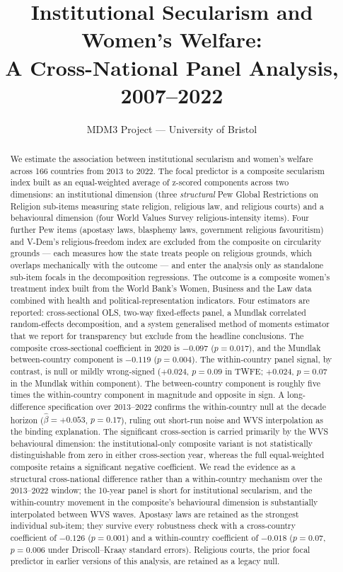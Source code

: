 \documentclass[12pt,a4paper]{article}
\title{Institutional Secularism and Women's Welfare:\\
A Cross-National Panel Analysis, 2007--2022}
\author{MDM3 Project --- University of Bristol}
\date{}
\begin{document}
\maketitle

\begin{abstract}
\noindent We estimate the association between institutional secularism and women's welfare across 166 countries from 2013 to 2022. The focal predictor is a composite secularism index built as an equal-weighted average of z-scored components across two dimensions: an institutional dimension (three \emph{structural} Pew Global Restrictions on Religion sub-items measuring state religion, religious law, and religious courts) and a behavioural dimension (four World Values Survey religious-intensity items). Four further Pew items (apostasy laws, blasphemy laws, government religious favouritism) and V-Dem's religious-freedom index are excluded from the composite on circularity grounds --- each measures how the state treats people on religious grounds, which overlaps mechanically with the outcome --- and enter the analysis only as standalone sub-item focals in the decomposition regressions. The outcome is a composite women's treatment index built from the World Bank's Women, Business and the Law data combined with health and political-representation indicators. Four estimators are reported: cross-sectional OLS, two-way fixed-effects panel, a Mundlak correlated random-effects decomposition, and a system generalised method of moments estimator that we report for transparency but exclude from the headline conclusions. The composite cross-sectional coefficient in 2020 is $-0.097$ ($p = 0.017$), and the Mundlak between-country component is $-0.119$ ($p = 0.004$). The within-country panel signal, by contrast, is null or mildly wrong-signed ($+0.024$, $p = 0.09$ in TWFE; $+0.024$, $p = 0.07$ in the Mundlak within component). The between-country component is roughly five times the within-country component in magnitude and opposite in sign. A long-difference specification over 2013--2022 confirms the within-country null at the decade horizon ($\hat\beta = +0.053$, $p = 0.17$), ruling out short-run noise and WVS interpolation as the binding explanation. The significant cross-section is carried primarily by the WVS behavioural dimension: the institutional-only composite variant is not statistically distinguishable from zero in either cross-section year, whereas the full equal-weighted composite retains a significant negative coefficient. We read the evidence as a structural cross-national difference rather than a within-country mechanism over the 2013--2022 window; the 10-year panel is short for institutional secularism, and the within-country movement in the composite's behavioural dimension is substantially interpolated between WVS waves. Apostasy laws are retained as the strongest individual sub-item; they survive every robustness check with a cross-country coefficient of $-0.126$ ($p = 0.001$) and a within-country coefficient of $-0.018$ ($p = 0.07$, $p = 0.006$ under Driscoll--Kraay standard errors). Religious courts, the prior focal predictor in earlier versions of this analysis, are retained as a legacy null.
\end{abstract}
\end{document}
